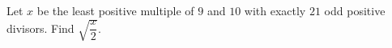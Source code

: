 Let $x$ be the least positive multiple of $9$ and $10$ with exactly $21$ odd positive divisors. Find $\sqrt{\dfrac{x}{2}}$.
